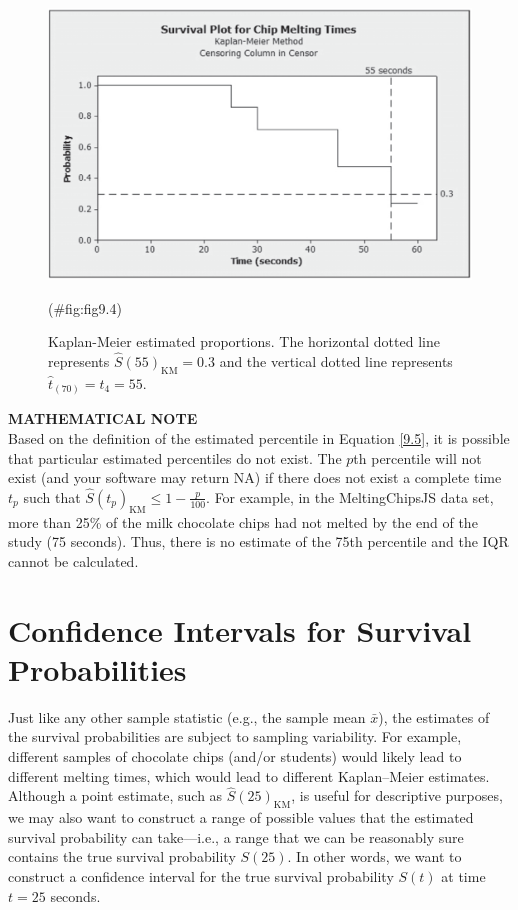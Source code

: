 \documentclass[
]{report}
\begin{document}
\begin{figure}

{\centering \includegraphics[width=1\linewidth]{docs/Fig9_4} 

}

\caption{Kaplan-Meier estimated proportions. The horizontal dotted line represents $\hat S(55)_{\mathrm{KM}} = 0.3$ and the vertical dotted line represents $\hat t_{(70)} = t_4 = 55$.}(\#fig:fig9.4)
\end{figure}

\large

\textbf{MATHEMATICAL NOTE}\\
Based on the definition of the estimated percentile in Equation \ref{9.5}, it is possible that particular estimated percentiles do not exist. The \(p\)th percentile will not exist (and your software may return NA) if there does not exist a complete time \(t_p\) such that \(\hat S(t_p)_{\mathrm{KM}} \le 1 - \tfrac{p}{100}\). For example, in the MeltingChipsJS data set, more than 25\% of the milk chocolate chips had not melted by the end of the study (75 seconds). Thus, there is no estimate of the 75th percentile and the IQR cannot be calculated.
\normalsize

\section{\texorpdfstring{\textbf{Confidence Intervals for Survival Probabilities}}{Confidence Intervals for Survival Probabilities}}\label{confidence-intervals-for-survival-probabilities}

Just like any other sample statistic (e.g., the sample mean \(\bar x\)), the estimates of the survival probabilities are subject to sampling variability. For example, different samples of chocolate chips (and/or students) would likely lead to different melting times, which would lead to different Kaplan--Meier estimates. Although a point estimate, such as \(\hat S(25)_{\mathrm{KM}}\), is useful for descriptive purposes, we may also want to construct a range of possible values that the estimated survival probability can take---i.e., a range that we can be reasonably sure contains the true survival probability \(S(25)\). In other words, we want to construct a confidence interval for the true survival probability \(S(t)\) at time \(t = 25\) seconds.
\end{document}
